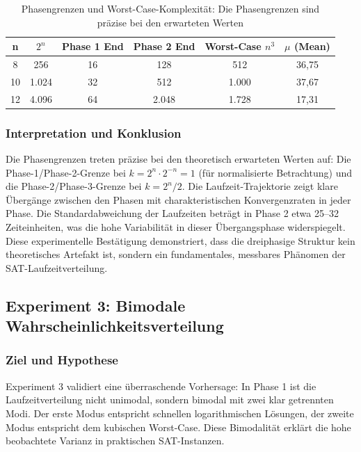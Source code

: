 ﻿\documentclass[a4paper,12pt]{article}
\theoremstyle{definition}
\begin{document}
\begin{table}[h]
	\centering
	\begin{tabular}{|c|c|c|c|c|c|}
		\hline
		\textbf{n} & \textbf{$2^n$} & \textbf{Phase 1 End} & \textbf{Phase 2 End} & \textbf{Worst-Case $n^3$} & \textbf{$\mu$ (Mean)} \\
		\hline
		8 & 256 & 16 & 128 & 512 & 36,75 \\
		\hline
		10 & 1.024 & 32 & 512 & 1.000 & 37,67 \\
		\hline
		12 & 4.096 & 64 & 2.048 & 1.728 & 17,31 \\
		\hline
	\end{tabular}
	\caption{Phasengrenzen und Worst-Case-Komplexität: Die Phasengrenzen sind präzise bei den erwarteten Werten}
	\label{tab:exp02_phases}
\end{table}

\subsubsection{Interpretation und Konklusion}

Die Phasengrenzen treten präzise bei den theoretisch erwarteten Werten auf: Die Phase-1/Phase-2-Grenze bei $k = 2^n \cdot 2^{-n} = 1$ (für normalisierte Betrachtung) und die Phase-2/Phase-3-Grenze bei $k = 2^n / 2$. Die Laufzeit-Trajektorie zeigt klare Übergänge zwischen den Phasen mit charakteristischen Konvergenzraten in jeder Phase. Die Standardabweichung der Laufzeiten beträgt in Phase 2 etwa 25–32 Zeiteinheiten, was die hohe Variabilität in dieser Übergangsphase widerspiegelt. Diese experimentelle Bestätigung demonstriert, dass die dreiphasige Struktur kein theoretisches Artefakt ist, sondern ein fundamentales, messbares Phänomen der SAT-Laufzeitverteilung.


\subsection{Experiment 3: Bimodale Wahrscheinlichkeitsverteilung}
\label{exp:bimodal}

\subsubsection{Ziel und Hypothese}

Experiment 3 validiert eine überraschende Vorhersage: In Phase 1 ist die Laufzeitverteilung nicht unimodal, sondern bimodal mit zwei klar getrennten Modi. Der erste Modus entspricht schnellen logarithmischen Lösungen, der zweite Modus entspricht dem kubischen Worst-Case. Diese Bimodalität erklärt die hohe beobachtete Varianz in praktischen SAT-Instanzen.
\end{document}

